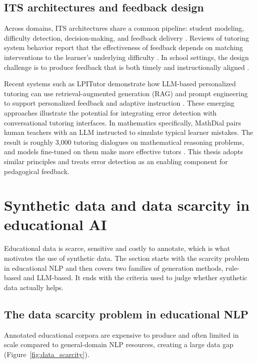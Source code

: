 \subsection{ITS architectures and feedback design}
\label{sec:sota_math_its}

Across domains, ITS architectures share a common pipeline: student modeling, difficulty detection, decision-making, and feedback delivery \parencite{Woolf2010}. Reviews of tutoring system behavior report that the effectiveness of feedback depends on matching interventions to the learner's underlying difficulty \parencite{VanLehn2006}. In school settings, the design challenge is to produce feedback that is both timely and instructionally aligned \parencite{KoedingerAnderson1997,Woolf2010}.

Recent systems such as LPITutor demonstrate how LLM-based personalized tutoring can use retrieval-augmented generation (RAG) and prompt engineering to support personalized feedback and adaptive instruction \parencite{LPITutor2025}. These emerging approaches illustrate the potential for integrating error detection with conversational tutoring interfaces. In mathematics specifically, MathDial pairs human teachers with an LLM instructed to simulate typical learner mistakes. The result is roughly 3{,}000 tutoring dialogues on mathematical reasoning problems, and models fine-tuned on them make more effective tutors \parencite{Macina2023MathDial}. This thesis adopts similar principles and treats error detection as an enabling component for pedagogical feedback.

\section{Synthetic data and data scarcity in educational AI}
\label{sec:sota_synth}

Educational data is scarce, sensitive and costly to annotate, which is what motivates the use of synthetic data. The section starts with the scarcity problem in educational NLP and then covers two families of generation methods, rule-based and LLM-based. It ends with the criteria used to judge whether synthetic data actually helps.

\subsection{The data scarcity problem in educational NLP}
\label{sec:sota_synth_scarcity}

Annotated educational corpora are expensive to produce and often limited in scale compared to general-domain NLP resources, creating a large data gap (Figure~\ref{fig:data_scarcity}).

